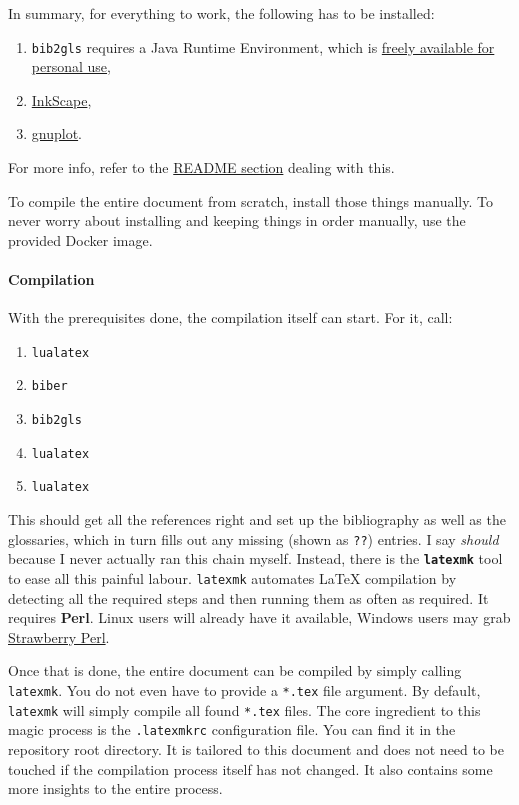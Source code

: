 In summary, for everything to work, the following has to be installed:
\begin{enumerate}
    \item \texttt{bib2gls} requires a Java Runtime Environment, which is
        \href{https://www.java.com/en/download/}{freely available for personal use},
    \item \href{https://inkscape.org/}{InkScape},
    \item \href{http://www.gnuplot.info/download.html}{gnuplot}.
\end{enumerate}
For more info, refer to the
\href{https://collaborating.tuhh.de/cap7863/latex-git-cookbook#installed-packages}{README section}
dealing with this.

To compile the entire document from scratch, install those things manually.
To never worry about installing and keeping things in order manually, use the provided
Docker image.

\paragraph{Compilation}
With the prerequisites done, the compilation itself can start.
For it, call:
\begin{enumerate}
    \item \texttt{lualatex}
    \item \texttt{biber}
    \item \texttt{bib2gls}
    \item \texttt{lualatex}
    \item \texttt{lualatex}
\end{enumerate}
This should get all the references right and set up the bibliography as well as the
glossaries, which in turn fills out any missing (shown as \texttt{??}) entries.
I say \emph{should} because I never actually ran this chain myself.
Instead, there is the \textbf{\texttt{latexmk}} tool to ease all this painful labour.
\texttt{latexmk} automates \LaTeX{} compilation by detecting all the required
steps and then running them as often as required.
It requires \textbf{Perl}.
Linux users will already have it available, Windows users may grab
\href{http://strawberryperl.com/}{Strawberry Perl}.

Once that is done, the entire document can be compiled by simply calling
\texttt{latexmk}.
You do not even have to provide a \texttt{*.tex} file argument.
By default, \texttt{latexmk} will simply compile all found \texttt{*.tex} files.
The core ingredient to this magic process is the \texttt{.latexmkrc} configuration file.
You can find it in the repository root directory.
It is tailored to this document and does not need to be touched if the compilation
process itself has not changed.
It also contains some more insights to the entire process.

